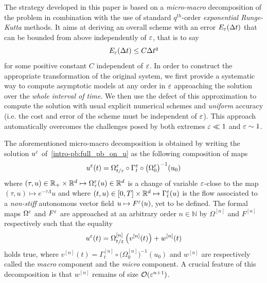 The strategy developed in this paper is based on a {\em micro-macro}
decomposition of the problem in combination with the use of standard
$q^{th}$-order {\em exponential Runge-Kutta} methods. It aims at deriving
an overall  scheme with an error $E_{\varepsilon}(\Delta t)$ that can be bounded from
above independently of $\varepsilon$, that is to say 
$$
E_{\varepsilon}(\Delta t) \leq C \Delta t^q
$$
for some positive constant $C$ independent of $\varepsilon$. In order to
construct the appropriate transformation of the original system, we first
provide a systematic way to compute asymptotic models at any order in
$\varepsilon$ approaching the solution over the \textit{whole interval of time}.
We then use the defect of this approximation to compute the solution with
usual explicit numerical schemes and \textit{uniform} accuracy (i.e. the
cost and error of the scheme must be independent of $\varepsilon$). This approach
automatically overcomes the challenges posed by both extremes $\varepsilon \ll 1$
and $\varepsilon \sim 1$. 
%

The aforementioned micro-macro decomposition is obtained by writing the
solution $u^{\varepsilon}$ of~\eqref{intro-pb:full_pb_on_u} as the following
composition of maps
\begin{equation} \label{intro_eq:composition_u}
  u^{\varepsilon}(t) = 
  \Omega^{\varepsilon}_{t/\varepsilon} \circ \Gamma^{\varepsilon}_t 
  \circ \big( \Omega^{\varepsilon}_0 \big)^{-1} (u_0) 
\end{equation}
where $(\tau, u) \in \mathbb{R}_+ \times \mathbb{R}^d \mapsto \Omega^{\varepsilon}_{\tau}(u) \in
\mathbb{R}^d$ is a change of variable $\varepsilon$-close to the map $(\tau, u) \mapsto
e^{-\tau \Lambda} u$ and where $(t,u) \in [0,T] \times \mathbb{R}^d \mapsto
\Gamma^{\varepsilon}_t (u)$ is the flow associated to a \textit{non-stiff}
autonomous vector field $u \mapsto F^{\varepsilon} (u)$, yet to be defined. The
formal maps $\Omega^{\varepsilon}$ and $F^{\varepsilon}$ are approached at an arbitrary
order $n \in \mathbb{N}$ by $\Omega^{[n]}$ and $F^{[n]}$ respectively such
that the equality 
\begin{equation} \label{intro_eq:mima_decomp}
u^{\varepsilon}(t) = \Omega^{[n]}_{t/\varepsilon} \left( v^{[n]}(t) \right) + w^{[n]}(t) 
\end{equation} 
holds true, where $v^{[n]}(t)  = \Gamma^{[n]}_t \circ \big( \Omega^{[n]}_0
\big)^{-1} (u_0)$  and $w^{[n]}$ are respectively called the
\textit{macro} component and the \textit{micro} component. A crucial
feature of this decomposition is that $w^{[n]}$ remains of size
$\mathcal{O}(\varepsilon^{n+1})$. 

